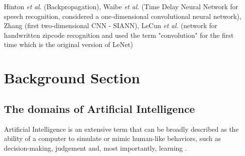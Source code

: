 \documentclass[12pt]{article}
\begin{document}
Hinton \textit{et al.} (Backpropagation), Waibe \textit{et al.} (Time Delay Neural Network for speech recognition, considered a one-dimensional convolutional neural network), Zhang (first two-dimensional CNN - SIANN), LeCun \textit{et al.} (network for handwritten zipcode recognition and used the term "convolution" for the first time which is the original version of LeNet)



\newpage
\section{Background Section}



\subsection{The domains of Artificial Intelligence}
Artificial Intelligence is an extensive term that can be broadly described as the ability of a computer to simulate or mimic human-like behaviors, such as decision-making, judgement and, most importantly, learning \autocite{zhangStudyArtificialIntelligence2021}.

\newpage
\printbibliography
\end{document}
